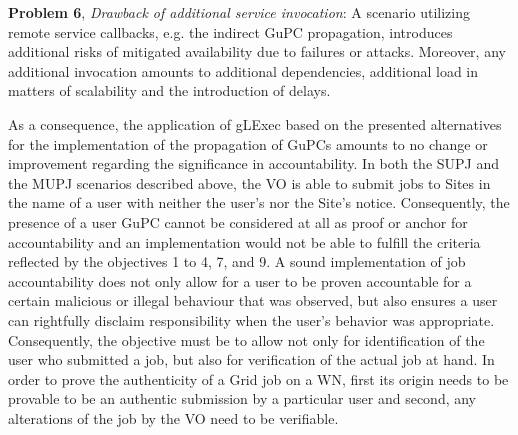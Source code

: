 \documentclass[10pt]{iopart}
\begin{document}
\noindent
\textbf{Problem 6}, \textit{Drawback of additional service invocation}:
A scenario utilizing remote service callbacks, e.g. the indirect GuPC
propagation, introduces additional risks of mitigated
availability due to failures or attacks. Moreover, any additional 
invocation amounts to additional dependencies, additional load in matters
of scalability and the introduction of delays.\\
\par
\endgroup\noindent
As a consequence, the application of gLExec based on the presented
alternatives for the implementation of the propagation
of GuPCs amounts to no change or improvement regarding the significance
in accountability. In both
the SUPJ and the MUPJ scenarios described above, the VO is able to submit jobs
to Sites in the name of a user with neither the user's nor the Site's notice.
Consequently, the presence of a user GuPC cannot be considered at all as
proof or anchor for accountability and an implementation would not be able to
fulfill the criteria reflected by the objectives 1 to 4, 7, and 9.
A sound implementation of job accountability does not only
allow for a user to be proven accountable for a certain
malicious or illegal behaviour that was observed, but also ensures a user can
rightfully
disclaim responsibility when the user's behavior was appropriate. Consequently,
the objective must be to allow not only for identification of the user who
submitted a job, but also for verification of the actual job at hand.
In order to prove the authenticity of a Grid job on a WN, first its origin
needs to be provable to be an authentic submission by a particular user
and second, any alterations of the job by the VO need to be verifiable.
\end{document}
